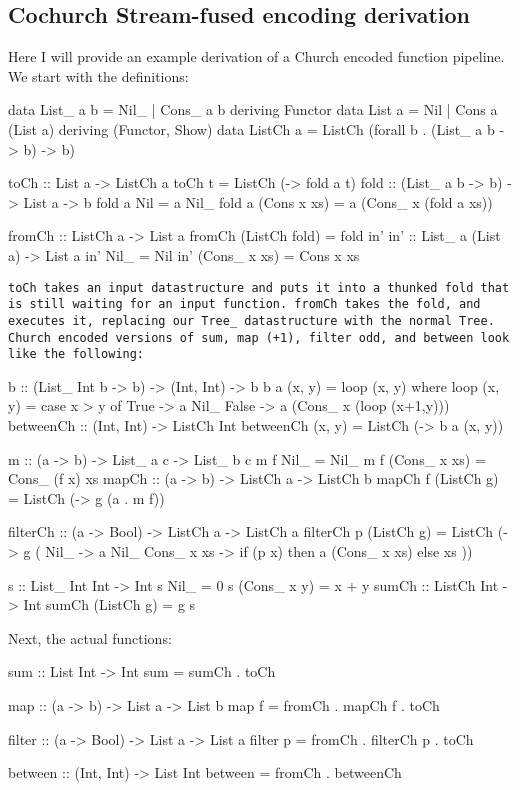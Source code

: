 
\subsection{Cochurch Stream-fused encoding derivation}\label{app:cochurch_stream}
Here I will provide an example derivation of a Church encoded function pipeline.
We start with the definitions:
\begin{spec}
data List_ a b = Nil_ | Cons_ a b deriving Functor
data List a = Nil | Cons a (List a) deriving (Functor, Show)
data ListCh a = ListCh (forall b . (List_ a b -> b) -> b)

toCh :: List a -> ListCh a
toCh t = ListCh (\a -> fold a t)
fold :: (List_ a b -> b) -> List a -> b
fold a Nil = a Nil_
fold a (Cons x xs) = a (Cons_ x (fold a xs))

fromCh :: ListCh a -> List a
fromCh (ListCh fold) = fold in'
in' :: List_ a (List a) -> List a
in' Nil_ = Nil
in' (Cons_ x xs) = Cons x xs
\end{spec}
\tt{toCh} takes an input datastructure and puts it into a thunked fold that is still waiting for an input function.
\tt{fromCh} takes the fold, and executes it, replacing our Tree\_ datastructure with the normal Tree.
Church encoded versions of sum, map (+1), filter odd, and between look like the following:
\begin{spec}
b :: (List_ Int b -> b) -> (Int, Int) -> b
b a (x, y) = loop (x, y)
  where loop (x, y) = case x > y of
    True -> a Nil_
    False -> a (Cons_ x (loop (x+1,y)))
betweenCh :: (Int, Int) -> ListCh Int
betweenCh (x, y) = ListCh (\a -> b a (x, y))

m :: (a -> b) -> List_ a c -> List_ b c
m f Nil_ = Nil_
m f (Cons_ x xs) = Cons_ (f x) xs
mapCh :: (a -> b) -> ListCh a -> ListCh b
mapCh f (ListCh g) = ListCh (\a -> g (a . m f))

filterCh :: (a -> Bool) -> ListCh a -> ListCh a
filterCh p (ListCh g) = ListCh (\a -> g (\case
   Nil_ -> a Nil_
   Cons_ x xs -> if (p x) then a (Cons_ x xs) else xs
 ))

s :: List_ Int Int -> Int
s Nil_ = 0
s (Cons_ x y) = x + y
sumCh :: ListCh Int -> Int
sumCh (ListCh g) = g s
\end{spec}
Next, the actual functions:
\begin{spec}
sum :: List Int -> Int
sum = sumCh . toCh

map :: (a -> b) -> List a -> List b
map f = fromCh . mapCh f . toCh

filter :: (a -> Bool) -> List a -> List a
filter p = fromCh . filterCh p . toCh

between :: (Int, Int) -> List Int
between = fromCh . betweenCh
\end{spec}
